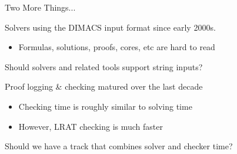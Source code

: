 \documentclass{beamer}
\begin{document}
\begin{frame}{Two More Things...}

\large

Solvers using the DIMACS input format since early 2000s.
\begin{itemize}
\item Formulas, solutions, proofs, cores, etc are hard to read
\end{itemize}

\bigskip

Should solvers and related tools support string inputs?

\bigskip
\bigskip
\bigskip
\pause

Proof logging \& checking matured over the last decade
\begin{itemize}
\item Checking time is roughly similar to solving time
\item However, LRAT checking is much faster
\end{itemize}

\bigskip

Should we have a track that combines solver and checker time?

\end{frame}
\end{document}
